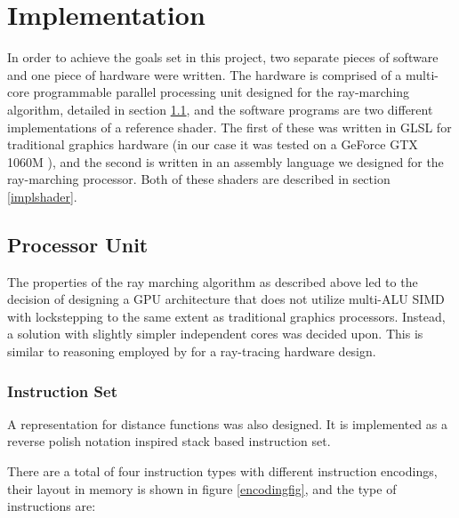 \chapter{Implementation}
	
	In order to achieve the goals set in this project, two separate pieces of
	software and one piece of hardware were written. The hardware is comprised
	of a multi-core programmable parallel processing unit designed for the
	ray-marching algorithm, detailed in section \ref{implproc}, and the
	software programs are two different implementations of a reference shader.
	The first of these was written in GLSL for traditional graphics hardware
	(in our case it was tested on a GeForce GTX 1060M ), and the second is
	written in an assembly language we designed for the ray-marching processor.
	Both of these shaders are described in section \ref{implshader}.
	
	\section{Processor Unit} \label{implproc}

		The properties of the ray marching algorithm as described above led to
		the decision of designing a GPU architecture that does not utilize
		multi-ALU SIMD with lockstepping to the same extent as traditional
		graphics processors. Instead, a solution with slightly simpler
		independent cores was decided upon. This is similar to reasoning
		employed by \cite{Woop2005} for a ray-tracing hardware design.
	
		\subsection{Instruction Set}

			A representation for distance functions was also designed. It is
			implemented as a reverse polish notation inspired stack based 
			instruction set.
	
			There are a total of four instruction types with different
			instruction encodings, their layout in memory is shown in figure
			\ref{encodingfig}, and the type of instructions are:

